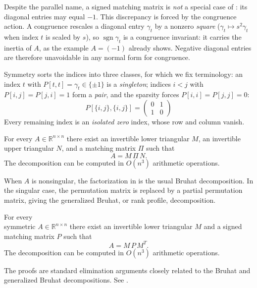 \documentclass[preprint,12pt]{elsarticle}
\theoremstyle{plain}
\theoremstyle{nonumberplain}
\numberwithin{equation}{section}
\DeclareMathOperator{\sgn}{sgn}
\newcommand{\by}{\times}
\numberwithin{theorem}{section}
\begin{document}
Despite the parallel name, a signed matching matrix is \emph{not} a special case of : its diagonal entries may equal $-1$.  This discrepancy is forced by the congruence action.  A congruence rescales a diagonal entry $\gamma_t$ by a nonzero \emph{square} ($\gamma_t \mapsto s^2 \gamma_t$ when index $t$ is scaled by $s$), so $\sgn \gamma_t$ is a congruence invariant: it carries the inertia of $A$, as the example $A = (-1)$ already shows. Negative diagonal entries are therefore unavoidable in any normal form for congruence.

Symmetry sorts the indices into three classes, for which we fix terminology: an index $t$ with $P[t,t] = \gamma_t \in \{\pm 1\}$ is a \emph{singleton}; indices $i < j$ with $P[i,j] = P[j,i] = 1$ form a \emph{pair}, and the sparsity forces $P[i,i] = P[j,j] = 0$:
$$
P[\{i,j\},\{i,j\}] =
\begin{pmatrix} 0 & 1\\ 1 & 0
\end{pmatrix}
$$
Every remaining index is an \emph{isolated zero} index, whose row and column vanish.

\begin{lemma}\label{lem:reduction-lu}
  For every $A \in \mathbb{R}^{n \by n}$ there exist an invertible lower triangular $M$, an invertible upper triangular $N$, and a matching matrix $\Pi$ such that
  \[
    A = M \, \Pi \, N .
  \]
  The decomposition can be computed in $O(n^3)$ arithmetic operations.
\end{lemma}

When $A$ is nonsingular, the factorization in  is the usual Bruhat decomposition.  In the singular case, the permutation matrix is replaced by a partial permutation matrix, giving the generalized Bruhat, or rank profile, decomposition.

\begin{lemma}\label{lem:reduction-sym}
  For every\\symmetric $A \in \mathbb{R}^{n \by n}$ there exist an invertible lower triangular $M$ and a signed matching matrix $P$ such that
  \[
    A = M \, P \, M^T .
  \]
  The decomposition can be computed in $O(n^3)$ arithmetic operations.
\end{lemma}

The proofs are standard elimination arguments closely related to the Bruhat and generalized Bruhat decompositions. See .
\end{document}
